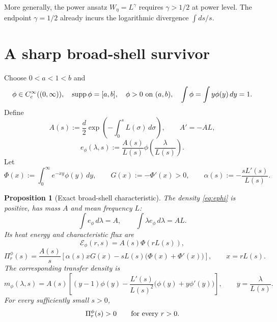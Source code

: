 \documentclass[11pt]{article}
\newtheorem{proposition}[theorem]{Proposition}
\theoremstyle{remark}
\newcommand{\supp}{\operatorname{supp}}
\begin{document}
More generally, the power ansatz \(W_\eta=L^\gamma\) requires
\(\gamma>1/2\) at power level.  The endpoint \(\gamma=1/2\) already
incurs the logarithmic divergence \(\int ds/s\).

\section{A sharp broad-shell survivor}

Choose \(0<a<1<b\) and
\begin{equation}
\label{eq:phi}
 \phi\in C_c^\infty((0,\infty)),
 \quad
 \supp\phi=[a,b],
 \quad
 \phi>0\ \hbox{on }(a,b),
 \quad
 \int\phi=\int y\phi(y)\,dy=1.
\end{equation}
Define
\begin{equation}
\label{eq:A}
 A(s):=\frac d2
 \exp\left(-\int_0^sL(\sigma)\,d\sigma\right),
 \qquad A'=-AL,
\end{equation}
\begin{equation}
\label{eq:ephi}
 e_\phi(\lambda,s):=
 \frac{A(s)}{L(s)}
 \phi\left(\frac{\lambda}{L(s)}\right).
\end{equation}
Let
\begin{equation}
\label{eq:Phi}
 \Phi(x):=\int_0^\infty e^{-xy}\phi(y)\,dy,
 \qquad
 G(x):=-\Phi'(x)>0,
 \qquad
 \alpha(s):=-\frac{sL'(s)}{L(s)}.
\end{equation}

\begin{proposition}[Exact broad-shell characteristic]
\label{prop:broad}
The density \eqref{eq:ephi} is positive, has mass \(A\) and mean
frequency \(L\):
\begin{equation}
\label{eq:mass-mean}
 \int e_\phi\,d\lambda=A,
 \qquad
 \int\lambda e_\phi\,d\lambda=AL.
\end{equation}
Its heat energy and characteristic flux are
\begin{equation}
\label{eq:Ephi}
 \mathcal E_\phi(r,s)=A(s)\Phi(rL(s)),
\end{equation}
\begin{equation}
\label{eq:Piphi}
 \boxed{
 \Pi^\phi_r(s)
 =
 \frac{A(s)}s
 \left[
 \alpha(s)xG(x)
 -sL(s)\bigl(\Phi(x)+\Phi'(x)\bigr)
 \right],\qquad x=rL(s).}
\end{equation}
The corresponding transfer density is
\begin{equation}
\label{eq:mphi}
 \boxed{
 m_\phi(\lambda,s)
 =
 A(s)\left[
 (y-1)\phi(y)
 -\frac{L'(s)}{L(s)^2}
 \bigl(\phi(y)+y\phi'(y)\bigr)
 \right],\qquad y=\frac{\lambda}{L(s)}.}
\end{equation}
For every sufficiently small \(s>0\),
\begin{equation}
\label{eq:positive-flux}
 \Pi^\phi_r(s)>0
 \qquad\hbox{for every \(r>0\).}
\end{equation}
\end{proposition}
\end{document}
